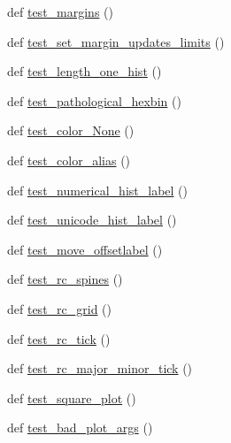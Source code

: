 \begin{DoxyCompactItemize}
def \hyperlink{namespacematplotlib_1_1tests_1_1test__axes_a9726f055ebd5278818b9b56d6ae6e2ba}{test\+\_\+margins} ()
\item 
def \hyperlink{namespacematplotlib_1_1tests_1_1test__axes_a18343613fde282d41a60e9a30c739d50}{test\+\_\+set\+\_\+margin\+\_\+updates\+\_\+limits} ()
\item 
def \hyperlink{namespacematplotlib_1_1tests_1_1test__axes_a8e703c51a6a6b8296137ac4041cb25df}{test\+\_\+length\+\_\+one\+\_\+hist} ()
\item 
def \hyperlink{namespacematplotlib_1_1tests_1_1test__axes_a2a1ee9490ddf47880aaa0d08ed524ef8}{test\+\_\+pathological\+\_\+hexbin} ()
\item 
def \hyperlink{namespacematplotlib_1_1tests_1_1test__axes_a9fef7919eec4793c13e0413ba1cc71c0}{test\+\_\+color\+\_\+\+None} ()
\item 
def \hyperlink{namespacematplotlib_1_1tests_1_1test__axes_a7573272b4cd23cec3d7c57fd70ac7f8e}{test\+\_\+color\+\_\+alias} ()
\item 
def \hyperlink{namespacematplotlib_1_1tests_1_1test__axes_a30bcdc9ad02f36f500882567fd739377}{test\+\_\+numerical\+\_\+hist\+\_\+label} ()
\item 
def \hyperlink{namespacematplotlib_1_1tests_1_1test__axes_a53e2238d28968db5777ba2e7e998eb45}{test\+\_\+unicode\+\_\+hist\+\_\+label} ()
\item 
def \hyperlink{namespacematplotlib_1_1tests_1_1test__axes_a791a2f7063bbbf1ffc239b2713f8f5cd}{test\+\_\+move\+\_\+offsetlabel} ()
\item 
def \hyperlink{namespacematplotlib_1_1tests_1_1test__axes_ab0d524dabab53969a00ee551dfb38a9f}{test\+\_\+rc\+\_\+spines} ()
\item 
def \hyperlink{namespacematplotlib_1_1tests_1_1test__axes_aa190d53f3fac5b2002426f1615589d45}{test\+\_\+rc\+\_\+grid} ()
\item 
def \hyperlink{namespacematplotlib_1_1tests_1_1test__axes_a7e7904e018c553a25d991f458c0e938b}{test\+\_\+rc\+\_\+tick} ()
\item 
def \hyperlink{namespacematplotlib_1_1tests_1_1test__axes_a71c5f113325d0b70c4022d904d72d774}{test\+\_\+rc\+\_\+major\+\_\+minor\+\_\+tick} ()
\item 
def \hyperlink{namespacematplotlib_1_1tests_1_1test__axes_a5a9a80abe37d2121fe24a98558cdcf6f}{test\+\_\+square\+\_\+plot} ()
\item 
def \hyperlink{namespacematplotlib_1_1tests_1_1test__axes_a0d147d25bd04796ac94979ccea9b9aff}{test\+\_\+bad\+\_\+plot\+\_\+args} ()
\item 

\end{DoxyCompactItemize}
